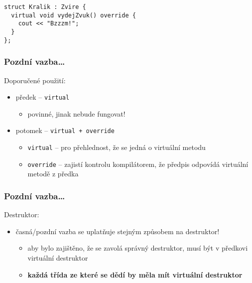 \begin{frame}[fragile]
\begin{yesblock}
\begin{twocols}
\twocolssep

\begin{lstlisting}[basicstyle=\small]
struct Kralik : Zvire {
  virtual void vydejZvuk() override {
    cout << "Bzzzm!";
  }
};
\end{lstlisting}
\end{twocols}
\end{yesblock}

\end{frame}





\begin{frame}[fragile]
\frametitle{Pozdní vazba\ldots}

\begin{block}{}
Doporučené použití:
\begin{itemize}
\item předek -- \lstinline|virtual|
\begin{itemize}
\item povinné, jinak nebude fungovat!
\end{itemize}
\item potomek -- \lstinline|virtual + override|
\begin{itemize}
\item \lstinline|virtual| -- pro přehlednost, že se jedná o virtuální metodu
\item \lstinline|override| -- zajistí kontrolu kompilátorem, že předpis odpovídá virtuální metodě z předka
\end{itemize}
\end{itemize}
\end{block}
\end{frame}


\begin{frame}[fragile]
\frametitle{Pozdní vazba\ldots}

\begin{block}{}
Destruktor:
\begin{itemize}
\item časná/pozdní vazba se uplatňuje stejným způsobem na destruktor!
\begin{itemize}
\item aby bylo zajištěno, že se zavolá správný destruktor, musí být v předkovi virtuální destruktor
\item \textbf{každá třída ze které se dědí by měla mít virtuální destruktor}
\end{itemize}
\end{itemize}
\end{block}
\end{frame}



